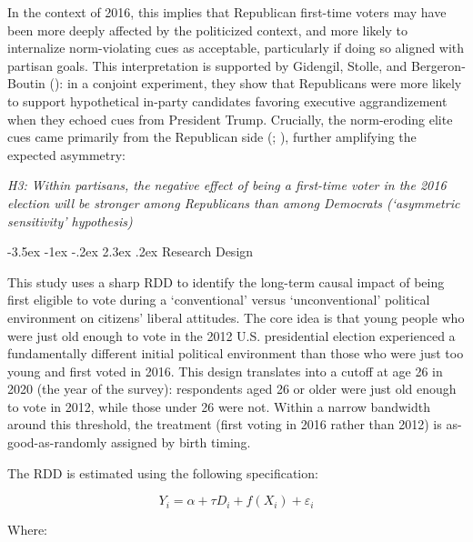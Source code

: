 \documentclass[
  10pt,
  letterpaper,
  DIV=11,
  numbers=noendperiod]{scrartcl}
\makeatletter
\renewcommand\section{\@startsection{section}{1}{\z@}%
  {-3.5ex \@plus -1ex \@minus -.2ex}%
  {2.3ex \@plus.2ex}%
  {\normalfont\Large\bfseries\centering}}
\makeatother
\begin{document}
In the context of 2016, this implies that Republican first-time voters
may have been more deeply affected by the politicized context, and more
likely to internalize norm-violating cues as acceptable, particularly if
doing so aligned with partisan goals. This interpretation is supported
by Gidengil, Stolle, and Bergeron-Boutin
(): in a conjoint experiment, they show
that Republicans were more likely to support hypothetical in-party
candidates favoring executive aggrandizement when they echoed cues from
President Trump. Crucially, the norm-eroding elite cues came primarily
from the Republican side (;
), further amplifying the expected
asymmetry:

\emph{H3: Within partisans, the negative effect of being a first-time
voter in the 2016 election will be stronger among Republicans than among
Democrats (`asymmetric sensitivity' hypothesis)}

\section{Research Design}\label{research-design}

This study uses a sharp RDD to identify the long-term causal impact of
being first eligible to vote during a `conventional' versus
`unconventional' political environment on citizens' liberal attitudes.
The core idea is that young people who were just old enough to vote in
the 2012 U.S. presidential election experienced a fundamentally
different initial political environment than those who were just too
young and first voted in 2016. This design translates into a cutoff at
age 26 in 2020 (the year of the survey): respondents aged 26 or older
were just old enough to vote in 2012, while those under 26 were not.
Within a narrow bandwidth around this threshold, the treatment (first
voting in 2016 rather than 2012) is as-good-as-randomly assigned by
birth timing.

The RDD is estimated using the following specification:

\[
Y_i = \alpha + \tau D_i + f(X_i) + \varepsilon_i
\]

Where:
\end{document}

